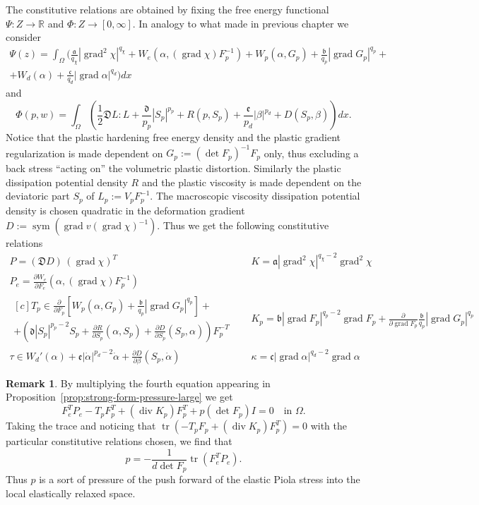 \documentclass[a4paper,10pt,twoside]{amsbook}
\numberwithin{section}{chapter}
\numberwithin{equation}{chapter}
\theoremstyle{definition}
\newtheorem{rmk}[prop]{Remark}
\DeclareMathOperator{\diver}{div}
\DeclareMathOperator{\tr}{tr}
\DeclareMathOperator{\sym}{sym}
\DeclareMathOperator{\grad}{grad}
\newcommand{\dind}[2]{\frac{\partial #1}{\partial #2}}
\begin{document}
The constitutive relations are obtained by fixing the free energy functional $\Psi\colon Z\to\mathbb{R}$ and $\Phi\colon Z\to[0,\infty]$. In analogy to what made in previous chapter we consider
\[
\begin{multlined}
\Psi(z)=\int_\Omega\bigg(\frac{\mathfrak{a}}{q_{\chi}}|\grad^2\chi|^{q_\chi}+W_e\left(\alpha,(\grad\chi)F_p^{-1}\right)+W_p(\alpha,G_p)+\frac{\mathfrak{b}}{q_p}|\grad G_p|^{q_p}+\\
+W_d(\alpha)+\frac{\mathfrak{c}}{q_d}|\grad\alpha|^{q_d}\bigg)dx
\end{multlined}
\]
and
\[
\Phi(p,w)=\int_\Omega\left(\frac{1}{2}\mathfrak{D}L:L+\frac{\mathfrak{d}}{p_p}|S_p|^{p_p}+R(p,S_p)+\frac{\mathfrak{e}}{p_d}|\beta|^{p_d}+D(S_p,\beta)\right)dx.
\]
Notice that the plastic hardening free energy density and the plastic gradient regularization is made dependent on $G_p:=(\det F_p)^{-1}F_p$ only, thus excluding a back stress ``acting on'' the volumetric plastic distortion. Similarly the plastic dissipation potential density $R$ and the plastic viscosity is made dependent on the deviatoric part $S_p$ of $L_p:=V_pF_p^{-1}$. The macroscopic viscosity dissipation potential density is chosen quadratic in the deformation gradient $D:=\sym\left(\grad v(\grad\chi)^{-1}\right)$. Thus we get the following constitutive relations
\begin{align}
P=(\mathfrak{D}D)\,(\grad\chi)^T\quad & K=\mathfrak{a}|\grad^2\chi|^{q_\chi-2}\grad^2\chi \\
P_e=\dind{W_e}{F_e}(\alpha,(\grad\chi)F_p^{-1})\quad & \\
\begin{multlined}[c]
T_p\in\dind{}{F_p}\left[W_p(\alpha,G_p)+\frac{\mathfrak{b}}{q_p}|\grad G_p|^{q_p}\right]
+\\
+\left(\mathfrak{d}|S_p|^{p_p-2}S_p+\dind{R}{S_p}(\alpha,S_p)+\dind{D}{S_p}(S_p,\alpha)\right)F_p^{-T}
\end{multlined}\quad & K_p=\mathfrak{b}|\grad F_p|^{q_p-2}\grad F_p+\dind{}{\grad F_p}\frac{\mathfrak{b}}{q_p}|\grad G_p|^{q_p} \\
\tau\in W_d'(\alpha)+\mathfrak{e}|\dot\alpha|^{p_d-2}\dot\alpha+\dind{D}{\beta}(S_p,\dot\alpha)\quad & \kappa=\mathfrak{c}|\grad\alpha|^{q_d-2}\grad\alpha
\end{align}

\begin{rmk}
By multiplying the fourth equation appearing in Proposition~\ref{prop:strong-form-pressure-large} we get
\[
F_e^TP_e-T_pF_p^T+(\diver K_p)F_p^T+p(\det F_p)I=0\quad\text{in $\Omega$}.
\]
Taking the trace and noticing that $\tr(-T_pF_p+(\diver K_p)F_p^T)=0$ with the particular constitutive relations chosen, we find that
\[
p=-\frac{1}{d\det F_p}\tr(F_e^TP_e).
\]
Thus $p$ is a sort of pressure of the push forward of the elastic Piola stress into the local elastically relaxed space.
\end{rmk}
\end{document}
